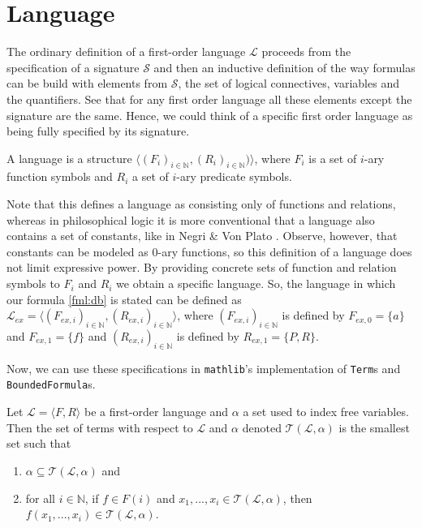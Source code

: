 \section{Language}\label{subsec:language}
The ordinary definition of a first-order language $\mathcal{L}$ proceeds from the specification of a signature $\mathcal{S}$ and then an inductive definition of the way formulas can be build with elements from $\mathcal{S}$, the set of logical connectives, variables and the quantifiers. See that for any first order language all these elements except the signature are the same. Hence, we could think of a specific first order language as being fully specified by its signature.

\begin{definition}\label{def:FO-Language}
\leanok
  A language is a structure $\langle(F_i)_{i\in \mathbb{N}}, (R_i)_{i\in \mathbb{N}})\rangle$, where $F_i$ is a set of $i$-ary function symbols and $R_i$ a set of $i$-ary predicate symbols.
\end{definition}

Note that this defines a language as consisting only of functions and relations, whereas in philosophical logic it is more conventional that a language also contains a set of constants, like in Negri \& Von Plato \cite{negri:2001}. Observe, however, that constants can be modeled as $0$-ary functions, so this definition of a language does not limit expressive power. By providing concrete sets of function and relation symbols to $F_i$ and $R_i$ we obtain a specific language. So, the language in which our formula \ref{fml:db} is stated can be defined as $\mathcal{L}_{ex} = \langle (F_{ex,i})_{i \in \mathbb{N}}, (R_{ex,i})_{i \in \mathbb{N}} \rangle$, where $(F_{ex,i})_{i \in \mathbb{N}}$ is defined by $F_{ex,0} = \{a\}$ and $F_{ex,1} = \{f\}$ and $(R_{ex,i})_{i \in \mathbb{N}}$ is defined by $R_{ex,1} = \{P, R\}$.

Now, we can use these specifications in \texttt{mathlib}'s implementation of \texttt{Term}s and \texttt{BoundedFormula}s.

\begin{definition}\label{def:FO-Term}
  \leanok
    Let $\mathcal{L} = \langle F, R \rangle$ be a first-order language and $\alpha$ a set used to index free variables. Then the set of terms with respect to $\mathcal{L}$ and $\alpha$ denoted $\mathcal{T}(\mathcal{L},\alpha)$ is the smallest set such that
        \begin{enumerate}
            \item $\alpha \subseteq \mathcal{T}(\mathcal{L},\alpha)$ and
            \item for all $i \in \mathbb{N}$, if $f \in F(i)$ and $x_1,...,x_i \in \mathcal{T}(\mathcal{L},\alpha)$, then $f(x_1,...,x_i) \in \mathcal{T}(\mathcal{L},\alpha)$.
        \end{enumerate}
\end{definition}

